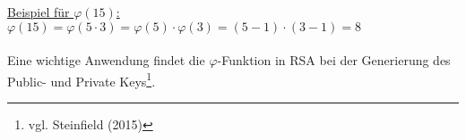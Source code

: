 \underline{Beispiel für $\varphi(15)$:}\\
$\varphi(15)=\varphi(5\cdot3)=\varphi(5)\cdot\varphi(3)=(5-1)\cdot(3-1)=8$
\\
\\
Eine wichtige Anwendung findet die $\varphi$-Funktion in RSA bei der Generierung des Public- und Private Keys\footnote{vgl. Steinfield (2015)}.
